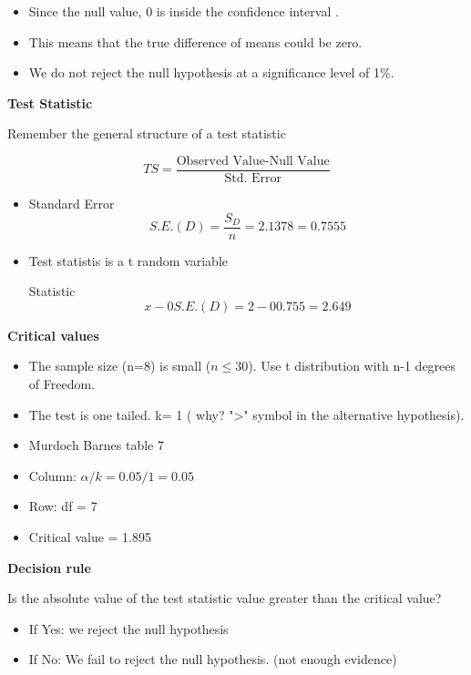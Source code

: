 \begin{itemize}
\item Since the null value, 0 is inside the confidence interval  .

\item This means that the true difference of means could be zero.

\item We do not reject the null hypothesis at a significance level of 1\%.

\end{itemize}


\noindent \textbf{Test Statistic}

Remember the general structure of a test statistic

\begin{framed}
\[TS =  \frac{\mbox{Observed Value-Null Value}}{\mbox{Std. Error}} \]
\end{framed}


\begin{itemize}
\item Standard Error\[S.E.(D) = \frac{S_D}{n}=2.1378= 0.7555\]

\item Test statistis is a t random variable

\itemTest Statistic\[x-0S.E.(D)=2 - 00.755= 2.649\]
\end{itemize}

\noindent \textbf{Critical values}

\begin{itemize}
\item The sample size (n=8) is small ($n \leq 30$). Use t distribution with n-1 degrees of Freedom.
\item The test is one tailed.  k= 1  ( why?  ">" symbol in the alternative hypothesis).
\item Murdoch Barnes table 7
\item Column:  $\alpha/k = 0.05/1= 0.05$
\item Row: df = 7
\item Critical value =  1.895    
\end{itemize}
\noindent \textbf{Decision rule}

\begin{framed}
\noindent Is the absolute value of the test statistic value greater than the critical value?
\begin{itemize}
\item If Yes: we reject the null hypothesis

\item If No: We fail to reject the null hypothesis. (not enough evidence)
\end{itemize}
\end{framed}

